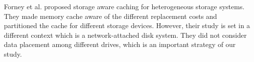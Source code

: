 Forney et al. \cite{Forney2002fast} proposed storage aware caching for
heterogeneous storage systems. They made memory cache aware of the
different replacement costs and partitioned the cache for different
storage devices.  However, their study is set in a different context
which is a network-attached disk system.  They did not consider data
placement among different drives, which is an important strategy of
our study.






